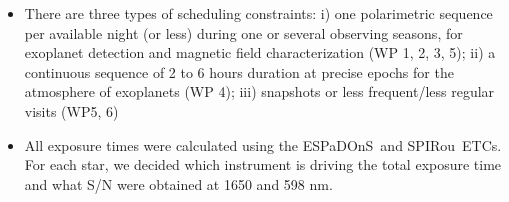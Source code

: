 \documentclass[
    traditabstract,
    longauth,
    onecolumn,
]{aa}
\def \spi{SPIRou}
\def \esp{ESPaDOnS}
\begin{document}
\begin{itemize}
    \item
 There are three types of scheduling constraints: i) one polarimetric sequence per available night (or less) during one or several observing seasons, for exoplanet detection and magnetic field characterization (WP 1, 2, 3, 5); ii) a continuous sequence of 2 to 6 hours duration at precise epochs for the atmosphere of exoplanets (WP 4); iii) snapshots or less frequent/less regular visits (WP5, 6)
 \item
 All exposure times were calculated using the \esp\ and \spi\ ETCs. For each star, we decided which instrument is driving the total exposure time and what S/N were obtained at 1650 and 598 nm.


\end{itemize}
\end{document}
